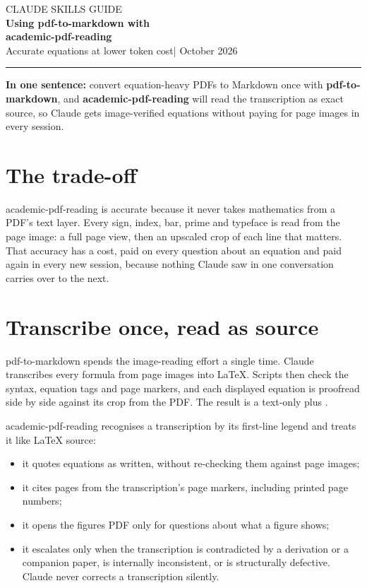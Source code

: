 \documentclass[11pt,a4paper]{article}
\newcommand\skilldate{12 October 2026}
\begin{document}
\thispagestyle{plain}
\begin{flushleft}
{\sffamily\small\color{muted}\MakeUppercase{Claude skills \textbullet{} Guide}}\\[4pt]
{\sffamily\fontsize{22}{27}\selectfont\bfseries\color{accent}Using pdf-to-markdown with\\ academic-pdf-reading}\\[6pt]
{\sffamily\large Accurate equations at lower token cost\quad\textcolor{muted}{|}\quad \skilldate}\\[2pt]
{\color{accent}\rule{\linewidth}{0.8pt}}
\end{flushleft}

\begin{glance}
\textbf{In one sentence:} convert equation-heavy PDFs to Markdown once with
\textbf{pdf-to-markdown}, and \textbf{academic-pdf-reading} will read the transcription as
exact source, so Claude gets image-verified equations without paying for page images in every
session.
\end{glance}

\section{The trade-off}
academic-pdf-reading is accurate because it never takes mathematics from a PDF's text layer.
Every sign, index, bar, prime and typeface is read from the page image: a full page view,
then an upscaled crop of each line that matters. That accuracy has a cost, paid on every
question about an equation and paid again in every new session, because nothing Claude saw in
one conversation carries over to the next.

\section{Transcribe once, read as source}
pdf-to-markdown spends the image-reading effort a single time. Claude transcribes every formula
from page images into LaTeX. Scripts then check the syntax, equation tags and page markers,
and each displayed equation is proofread side by side against its crop from the PDF. The
result is a text-only  plus .

academic-pdf-reading recognises a transcription by its first-line legend and treats it like
LaTeX source:
\begin{itemize}
\item it quotes equations as written, without re-checking them against page images;
\item it cites pages from the transcription's page markers, including printed page numbers;
\item it opens the figures PDF only for questions about what a figure shows;
\item it escalates only when the transcription is contradicted by a derivation or a companion
  paper, is internally inconsistent, or is structurally defective. Claude never corrects a
  transcription silently.
\end{itemize}
\end{document}
